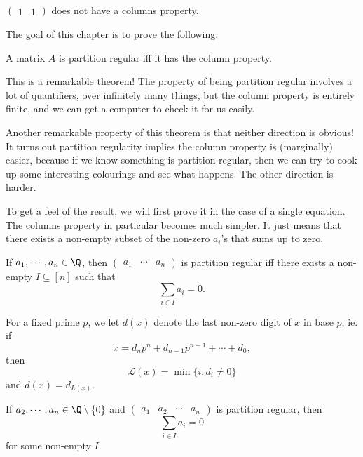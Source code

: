 \documentclass[a4paper]{article}
\begin{document}
\begin{eg}
  $\begin{pmatrix}1 & 1 \end{pmatrix}$ does not have a columns property.
\end{eg}

The goal of this chapter is to prove the following:
\begin{thm}
  A matrix $A$ is partition regular iff it has the column property.
\end{thm}
This is a remarkable theorem! The property of being partition regular involves a lot of quantifiers, over infinitely many things, but the column property is entirely finite, and we can get a computer to check it for us easily.

Another remarkable property of this theorem is that neither direction is obvious! It turns out partition regularity implies the column property is (marginally) easier, because if we know something is partition regular, then we can try to cook up some interesting colourings and see what happens. The other direction is harder.

To get a feel of the result, we will first prove it in the case of a single equation. The columns property in particular becomes much simpler. It just means that there exists a non-empty subset of the non-zero $a_i$'s that sums up to zero.

\begin{thm}
  If $a_1,\cdots, a_n \in \Q$, then $\begin{pmatrix} a_1 & \cdots & a_n \end{pmatrix}$ is partition regular iff there exists a non-empty $I \subseteq [n]$ such that
  \[
    \sum_{i \in I} a_i = 0.
  \]
\end{thm}

For a fixed prime $p$, we let $d(x)$ denote the last non-zero digit of $x$ in base $p$, ie. if
\[
  x = d_n p^n + d_{n - 1}p^{n - 1} + \cdots + d_0,
\]
then
\[
  \mathcal{L}(x) = \min\{i: d_i \not= 0\}
\]
and $d(x) = d_{L(x)}$.

\begin{prop}
  If $a_2, \cdots, a_n \in \Q \setminus \{0\}$ and $\begin{pmatrix}a_1 & a_2 & \cdots & a_n\end{pmatrix}$ is partition regular, then
  \[
    \sum_{i \in I} a_i = 0
  \]
  for some non-empty $I$.
\end{prop}
\end{document}
